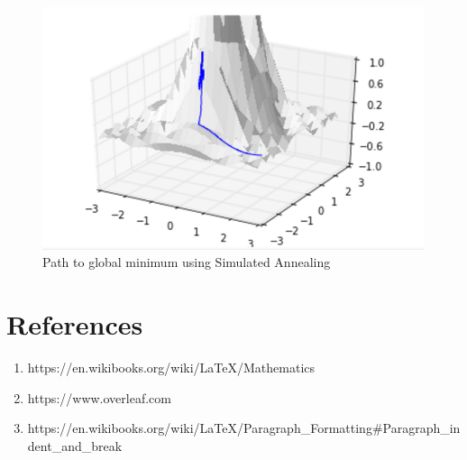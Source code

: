 \documentclass[a4paper]{article}
\begin{document}
\begin{figure}
\includegraphics[scale=0.5]{SA.png}
\caption{Path to global minimum using Simulated Annealing}
\end{figure}

\newpage
\section{References}

\begin{enumerate}
\item https://en.wikibooks.org/wiki/LaTeX/Mathematics
\item https://www.overleaf.com
\item https://en.wikibooks.org/wiki/LaTeX/Paragraph\_Formatting\#Paragraph\_indent\_and\_break
\end{enumerate}
\end{document}
